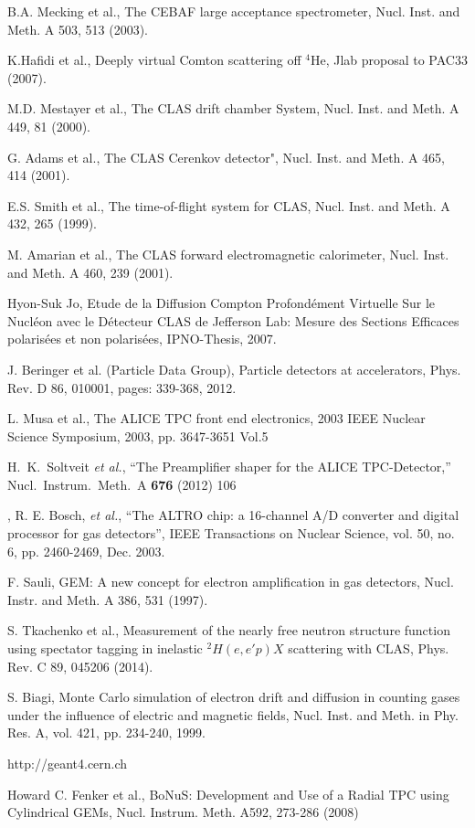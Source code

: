 \documentclass[twocolumn,showpacs,superscriptaddress,groupedaddress]{revtex4}
\begin{document}
\begin{thebibliography}{99}

   B.A. Mecking et al., The CEBAF large acceptance spectrometer, Nucl. Inst. 
   and Meth. A 503, 513 (2003).

   K.Hafidi et al., Deeply virtual Comton scattering off $^{4}$He, Jlab 
   proposal to PAC33 (2007).

   M.D. Mestayer et al., The CLAS drift chamber System, Nucl. Inst.  and Meth.  
   A 449, 81 (2000).

   G. Adams et al., The CLAS Cerenkov detector", Nucl. Inst. and Meth. A 465, 
   414 (2001).

   E.S. Smith et al., The time-of-flight system for CLAS, Nucl.  Inst. and 
   Meth. A 432, 265 (1999).

   M. Amarian et al., The CLAS forward electromagnetic calorimeter, Nucl.  
   Inst. and Meth. A 460, 239 (2001). 

   Hyon-Suk Jo, Etude de la Diffusion Compton Profond{\'e}ment Virtuelle Sur le 
   Nucl{\'e}on avec le D{\'e}tecteur CLAS de Jefferson Lab: Mesure des Sections 
   Efficaces polaris{\'e}es et non polaris{\'e}es, IPNO-Thesis, 2007.

   J. Beringer et al. (Particle Data Group), Particle detectors at 
   accelerators, Phys. Rev. D 86, 010001, pages: 339-368, 2012.

 L. Musa et al., The ALICE TPC front end electronics, 2003 IEEE Nuclear 
 Science Symposium, 2003, pp. 3647-3651 Vol.5
 
   H.~K.~Soltveit {\it et al.},
   ``The Preamplifier shaper for the ALICE TPC-Detector,''
   Nucl.\ Instrum.\ Meth.\ A {\bf 676} (2012) 106
 
 ,
 R. E. Bosch, {\it et al.}, ``The ALTRO chip: a 16-channel A/D converter and 
 digital processor for gas detectors'', IEEE Transactions on Nuclear Science, 
 vol. 50, no. 6, pp. 2460-2469, Dec. 2003.

   F. Sauli, GEM: A new concept for electron amplification in gas detectors, 
   Nucl. Instr. and Meth. A 386, 531 (1997).

   S. Tkachenko et al., Measurement of the nearly free neutron structure 
   function using spectator tagging in inelastic $^{2}H(e,e'p)X$ scattering 
   with CLAS,	Phys. Rev. C 89, 045206 (2014).

   S. Biagi, Monte Carlo simulation of electron drift and diffusion in counting 
   gases under the influence of electric and magnetic fields, Nucl.  Inst. and 
   Meth. in Phy. Res. A, vol. 421, pp. 234-240, 1999.

http://geant4.cern.ch
 	
Howard C. Fenker et al., BoNuS: Development and Use of a Radial TPC using Cylindrical GEMs, Nucl. Instrum. Meth. A592, 273-286 (2008)
\end{thebibliography}
\end{document}
